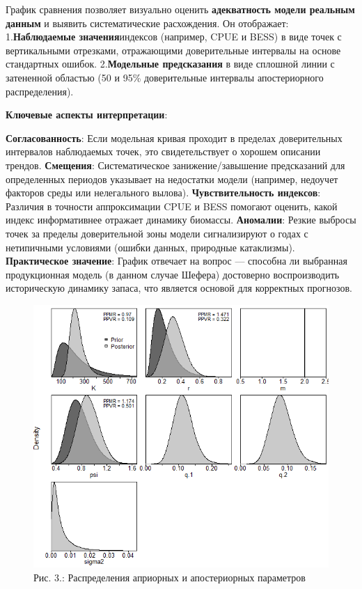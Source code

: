 \documentclass[
  letterpaper,
  DIV=11,
  numbers=noendperiod]{scrreprt}
\begin{document}
График сравнения позволяет визуально оценить \textbf{адекватность модели
реальным данным} и выявить систематические расхождения. Он отображает:
1.\textbf{Наблюдаемые значения}индексов (например, CPUE и BESS) в виде
точек с вертикальными отрезками, отражающими доверительные интервалы на
основе стандартных ошибок. 2.\textbf{Модельные предсказания} в виде
сплошной линии с затененной областью (50 и 95\% доверительные интервалы
апостериорного распределения).

\textbf{Ключевые аспекты интерпретации}:

\textbf{Согласованность}: Если модельная кривая проходит в пределах
доверительных интервалов наблюдаемых точек, это свидетельствует о
хорошем описании трендов. \textbf{Смещения}: Систематическое
занижение/завышение предсказаний для определенных периодов указывает на
недостатки модели (например, недоучет факторов среды или нелегального
вылова). \textbf{Чувствительность индексов}: Различия в точности
аппроксимации CPUE и BESS помогают оценить, какой индекс информативнее
отражает динамику биомассы. \textbf{Аномалии}: Резкие выбросы точек за
пределы доверительной зоны модели сигнализируют о годах с нетипичными
условиями (ошибки данных, природные катаклизмы). \textbf{Практическое
значение}: График отвечает на вопрос --- способна ли выбранная
продукционная модель (в данном случае Шефера) достоверно воспроизводить
историческую динамику запаса, что является основой для корректных
прогнозов.

\begin{figure}[H]

{\centering \includegraphics[width=0.6\linewidth,height=\textheight,keepaspectratio]{images/JABBA3.PNG}

}

\caption{Рис. 3.: Распределения априорных и апостериорных параметров}

\end{figure}%
\end{document}
